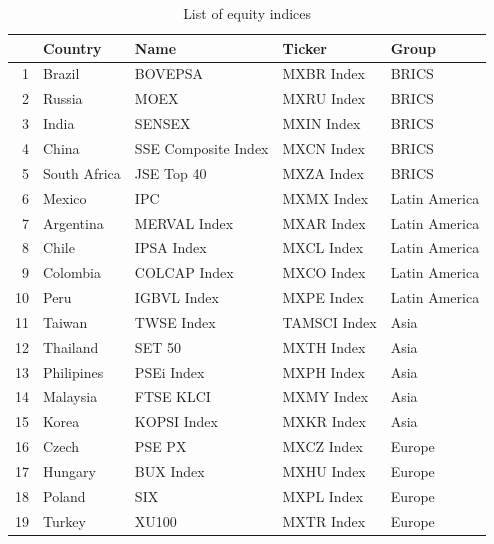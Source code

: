 \documentclass[11pt,preprint, authoryear]{elsarticle}
\numberwithin{equation}{section}
\numberwithin{figure}{section}
\numberwithin{table}{section}
\begin{document}
\begin{longtable}{rllll}
\caption{List of equity indices \label{tabsample}} \\ 
  \hline
 & Country & Name & Ticker & Group \\ 
  \hline
1 & Brazil & BOVEPSA & MXBR Index & BRICS \\ 
  2 & Russia & MOEX & MXRU Index & BRICS \\ 
  3 & India & SENSEX & MXIN Index & BRICS \\ 
  4 & China & SSE Composite Index & MXCN Index & BRICS \\ 
  5 & South Africa & JSE Top 40 & MXZA Index & BRICS \\ 
  6 & Mexico & IPC & MXMX Index & Latin America \\ 
  7 & Argentina & MERVAL Index & MXAR Index & Latin America \\ 
  8 & Chile & IPSA Index & MXCL Index & Latin America \\ 
  9 & Colombia & COLCAP Index & MXCO Index & Latin America \\ 
  10 & Peru & IGBVL Index & MXPE Index & Latin America \\ 
  11 & Taiwan & TWSE Index & TAMSCI Index & Asia \\ 
  12 & Thailand & SET 50 & MXTH Index & Asia \\ 
  13 & Philipines & PSEi Index & MXPH Index & Asia \\ 
  14 & Malaysia & FTSE KLCI & MXMY Index & Asia \\ 
  15 & Korea & KOPSI Index & MXKR Index & Asia \\ 
  16 & Czech & PSE PX & MXCZ Index & Europe \\ 
  17 & Hungary & BUX Index & MXHU Index & Europe \\ 
  18 & Poland & SIX & MXPL Index & Europe \\ 
  19 & Turkey & XU100 & MXTR Index & Europe \\ 
   \hline
\hline
\end{longtable}
\end{document}
